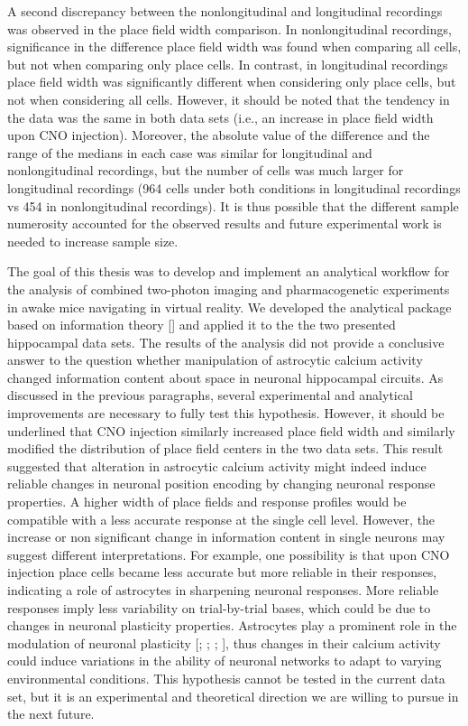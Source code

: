 A second discrepancy between the nonlongitudinal and longitudinal recordings was observed in the place field width comparison. 
In nonlongitudinal recordings, significance in the difference place field width was found when comparing all cells, but not when comparing only place cells. 
In contrast, in longitudinal recordings place field width was significantly different when considering only place cells, but not when considering all cells.
However, it should be noted that the tendency in the data was the same in both data sets (i.e., an increase in place field width upon CNO injection).
Moreover, the absolute value of the difference and the range of the medians in each case was similar for longitudinal and nonlongitudinal recordings, but the number of cells was much larger for longitudinal recordings (964 cells under both conditions in longitudinal recordings vs 454 in nonlongitudinal recordings).
It is thus possible that the different sample numerosity accounted for the observed results and future experimental work is needed to increase sample size. 

The goal of this thesis was to develop and implement an analytical workflow for the analysis of combined two-photon imaging and pharmacogenetic experiments in awake mice navigating in virtual reality. 
We developed the analytical package based on information theory [\cite{shannon1948}] and applied it to the the two presented hippocampal data sets. 
The results of the analysis did not provide a conclusive answer to the question whether manipulation of astrocytic calcium activity changed information content about space in neuronal hippocampal circuits. 
As discussed in the previous paragraphs, several experimental and analytical improvements are necessary to fully test this hypothesis.
However, it should be underlined that CNO injection similarly increased place field width and similarly modified the distribution of place field centers in the two data sets. 
This result suggested that alteration in astrocytic calcium activity might indeed induce reliable changes in neuronal position encoding by changing neuronal response properties. 
A higher width of place fields and response profiles would be compatible with a less accurate response at the single cell level. 
However, the increase or non significant change in information content in single neurons may suggest different interpretations. 
For example, one possibility is that upon CNO injection place cells became less accurate but more reliable in their responses, indicating a role of astrocytes in sharpening neuronal responses. 
More reliable responses imply less variability on trial-by-trial bases, which could be due to changes in neuronal plasticity properties. 
Astrocytes play a prominent role in the modulation of neuronal plasticity [\cite{pascual2005}; \cite{serrano2006gabaergic}; \cite{henneberger2010}; \cite{min2012astrocyte}], thus changes in their calcium activity could induce variations in the ability of neuronal networks to adapt to varying environmental conditions. 
This hypothesis cannot be tested in the current data set, but it is an experimental and theoretical direction we are willing to pursue in the next future. 

